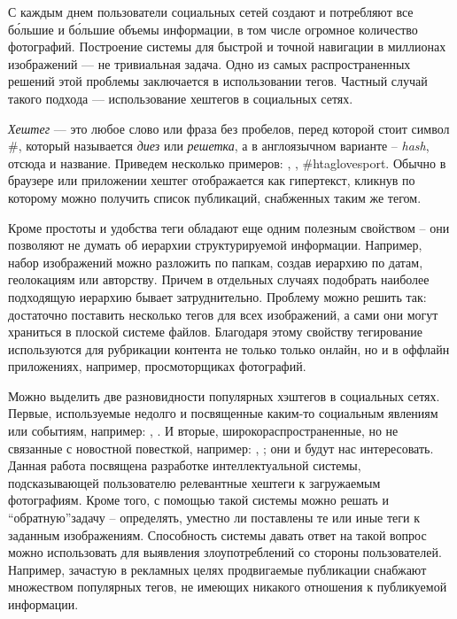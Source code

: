 \indent
\indent
С каждым днем пользователи социальных сетей создают и потребляют все б\'{о}льшие
и б\'{о}льшие объемы информации, в том числе огромное количество фотографий.
Построение системы для быстрой и точной навигации в миллионах изображений
 --- не тривиальная задача. Одно из самых распространенных решений этой
 проблемы заключается в использовании тегов. Частный случай такого подхода ---
 использование хештегов в социальных сетях.


\indent
\textit{Хештег} --- это любое слово или фраза без пробелов, перед которой стоит 
символ \#, который называется \textit{диез} или \textit{решетка}, а в англоязычном 
варианте -- \textit{hash}, отсюда и название. Приведем несколько примеров:
, , \#htag{lovesport}. Обычно в браузере или 
приложении хештег отображается как гипертекст, кликнув по которому можно 
получить список публикаций, снабженных таким же тегом.

\indent
Кроме простоты и удобства теги обладают еще одним полезным свойством 
-- они позволяют не думать об  иерархии структурируемой информации. 
Например, набор изображений можно разложить
по папкам, создав иерархию по датам, геолокациям или авторству. Причем в отдельных
случаях подобрать наиболее подходящую иерархию бывает затруднительно. Проблему
можно решить так: достаточно поставить несколько тегов для всех изображений,
а сами они могут храниться в плоской системе файлов.
Благодаря этому свойству тегирование используются  для рубрикации контента 
не только только онлайн, но и в оффлайн приложениях, например, 
просмоторщиках фотографий. 


\indent
Можно выделить две разновидности популярных хэштегов в социальных сетях.
Первые, используемые недолго и посвященные каким-то социальным явлениям
или событиям, например: , . 
И вторые, широкораспространенные, но не связанные с новостной повесткой, 
например: , ; они и будут нас интересовать.
 Данная работа посвящена разработке интеллектуальной системы, 
подсказывающей пользователю релевантные хештеги к загружаемым фотографиям.
 Кроме того, с помощью такой системы можно решать и 
  \textquotedblleft обратную\textquotedblright  задачу -- определять,
уместно ли поставлены те или иные теги к заданным изображениям. 
Способность системы давать ответ на такой вопрос можно использовать для 
выявления злоупотреблений со стороны пользователей. Например, зачастую
 в рекламных целях продвигаемые публикации снабжают множеством популярных 
 тегов, не имеющих никакого отношения к публикуемой информации.
 
 